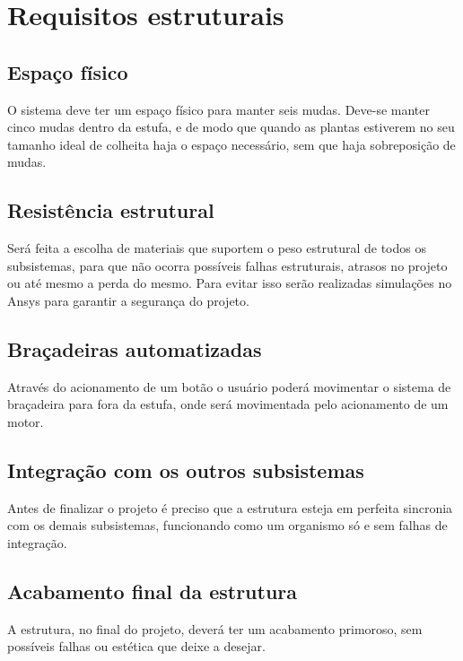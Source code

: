 \section{Requisitos estruturais}

\subsection{Espaço físico} 

O sistema deve ter um espaço físico para manter seis mudas. Deve-se manter cinco mudas dentro da estufa, e de modo que quando as plantas estiverem no seu tamanho ideal de colheita haja o espaço necessário, sem que haja sobreposição de mudas.

\subsection{Resistência estrutural} 

Será feita a escolha de materiais que suportem o peso estrutural de todos os subsistemas, para que não ocorra possíveis falhas estruturais, atrasos no projeto ou até mesmo a perda do mesmo. Para evitar isso serão realizadas simulações no Ansys para garantir a segurança do projeto.

\subsection{Braçadeiras automatizadas}

Através do acionamento de um botão o usuário poderá movimentar o sistema de braçadeira para fora da estufa, onde será movimentada pelo acionamento de um motor.

\subsection{Integração com os outros subsistemas}

Antes de finalizar o projeto é preciso que a estrutura esteja em perfeita sincronia com os demais subsistemas, funcionando como um organismo só e sem falhas de integração.

\subsection{Acabamento final da estrutura}

A estrutura, no final do projeto, deverá ter um acabamento primoroso, sem possíveis falhas ou estética que deixe a desejar.

